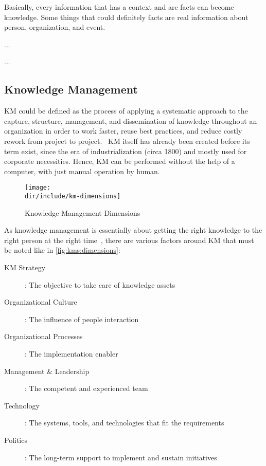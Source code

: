 Basically, every information that has a context and are facts can become knowledge.
Some things that could definitely facts are real information about person, organization, and event.

...~\autocite{Pomerol2001Relation}

...~\autocite{Liew2007Understanding}

\subsection{Knowledge Management}

\ac{KM} could be defined as the process of applying a systematic approach to the capture, structure, management, and dissemination of knowledge throughout an organization in order to work faster, reuse best practices, and reduce costly rework from project to project.~\autocite{Dalkir2005KM}
\ac{KM} itself has already been created before its term exist, since the era of industrialization (circa 1800) and mostly used for corporate necessities.
Hence, \ac{KM} can be performed without the help of a computer, with just manual operation by human.

\begin{figure}[htbp]
    \centering
    \texttt{[image: \\dir/include/km-dimensions]}
    \caption{Knowledge Management Dimensions}
    \label{fig:kms:dimensions}
\end{figure}

As knowledge management is essentially about getting the right knowledge to the right person at the right time~\autocite{Frost2010KM}, there are various factors around \ac{KM} that must be noted like in \autoref{fig:kms:dimensions}:

\begin{description}
  \item [KM Strategy]: The objective to take care of knowledge assets
  \item [Organizational Culture]: The influence of people interaction
  \item [Organizational Processes]: The implementation enabler
  \item [Management \& Leadership]: The competent and experienced team
  \item [Technology]: The systems, tools, and technologies that fit the requirements
  \item [Politics]: The long-term support to implement and sustain initiatives
\end{description}


